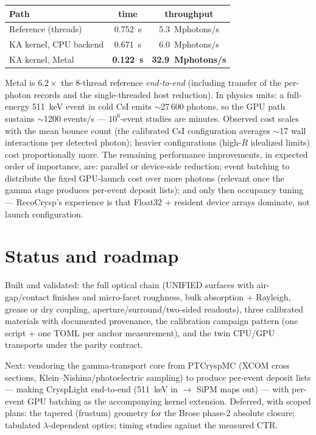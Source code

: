\documentclass[11pt,a4paper]{article}
\begin{document}
\begin{center}
\begin{tabular}{lcc}
  \toprule
  Path & time & throughput \\
  \midrule
  Reference (threads)            & 0.752~s & 5.3~Mphotons/s \\
  KA kernel, CPU backend         & 0.671~s & 6.0~Mphotons/s \\
  KA kernel, Metal               & \textbf{0.122~s} & \textbf{32.9~Mphotons/s} \\
  \bottomrule
\end{tabular}
\end{center}

Metal is $6.2\times$ the 8-thread reference \emph{end-to-end} (including transfer of
the per-photon records and the single-threaded host reduction). In physics units: a
full-energy 511~keV event in cold CsI emits $\sim$27\,600 photons, so the GPU path
sustains $\sim$1200 events/s --- $10^6$-event studies are minutes. Observed cost
scales with the mean bounce count (the calibrated CsI configuration averages
$\sim$17 wall interactions per detected photon); heavier configurations (high-$R$
idealized limits) cost proportionally more. The remaining performance improvements,
in expected order of importance, are: parallel or device-side reduction; event batching
to distribute the fixed GPU-launch cost over more photons (relevant once the
gamma stage produces per-event deposit lists); and only then occupancy tuning ---
RecoCrysp's experience is that Float32 + resident device arrays dominate, not launch
configuration.

\section{Status and roadmap}

Built and validated: the full optical chain (UNIFIED surfaces with air-gap/contact
finishes and micro-facet roughness, bulk absorption + Rayleigh, grease or dry
coupling, aperture/surround/two-sided readouts), three calibrated materials with
documented provenance, the calibration campaign pattern (one script + one TOML per
anchor measurement), and the twin CPU/GPU transports under the parity contract.

Next: vendoring the gamma-transport core from PTCryspMC (XCOM cross sections,
Klein--Nishina/photoelectric sampling) to produce per-event deposit lists --- making
CryspLight end-to-end (511~keV in $\to$ SiPM maps out) --- with per-event GPU batching
as the accompanying kernel extension. Deferred, with scoped plans: the tapered
(frustum) geometry for the Brose phase-2 absolute closure; tabulated
$\lambda$-dependent optics; timing studies against the measured CTR.
\end{document}
